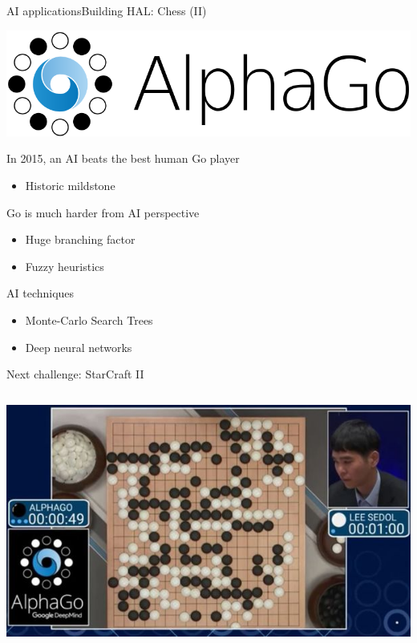 \documentclass[10pt,compress]{beamer} %
\begin{document}
\begin{frame}{AI applications}{Building HAL: Chess (II)}
	\vspace{-2cm}

	\begin{center}
		\includegraphics[width=0.4\linewidth]{figs/alphago.png}
	\end{center}

	\vspace{-0.2cm}
	In 2015, an AI beats the best human Go player
	\begin{itemize}
		\item Historic mildstone
	\end{itemize}
	Go is much harder from AI perspective
	\begin{itemize}
		\item Huge branching factor
		\item Fuzzy heuristics
	\end{itemize}
	AI techniques
	\begin{itemize}
		\item Monte-Carlo Search Trees
		\item Deep neural networks
	\end{itemize}
	Next challenge: StarCraft II

	\vspace{-4cm}
	\begin{columns}
		\includegraphics[width=\linewidth]{figs/leesedol.jpg}
	\end{columns}
\end{frame}
\end{document}
